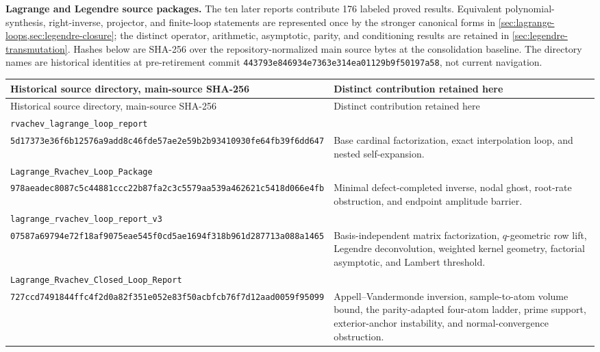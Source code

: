 \documentclass[11pt,oneside]{article}
\numberwithin{equation}{section}
\theoremstyle{definition}
\theoremstyle{remark}
\begin{document}
\medskip
\noindent\textbf{Lagrange and Legendre source packages.}
The ten later reports contribute 176 labeled proved results.  Equivalent
polynomial-synthesis, right-inverse, projector, and finite-loop statements
are represented once by the stronger canonical forms in
\cref{sec:lagrange-loops,sec:legendre-closure}; the distinct operator,
arithmetic, asymptotic, parity, and conditioning results are retained in
\cref{sec:legendre-transmutation}.  Hashes below are SHA-256 over the
repository-normalized main source bytes at the consolidation baseline.  The
directory names are historical identities at pre-retirement commit
\nolinkurl{443793e846934e7363e314ea01129b9f50197a58}, not current navigation.

\begin{center}
\scriptsize
\begin{longtable}{@{}p{}p{}@{}}
\toprule
Historical source directory, main-source SHA-256 & Distinct contribution retained here\\
\midrule
\endfirsthead
\toprule
Historical source directory, main-source SHA-256 & Distinct contribution retained here\\
\midrule
\endhead
\nolinkurl{rvachev_lagrange_loop_report}\\
\nolinkurl{5d17373e36f6b12576a9add8c46fde57ae2e59b2b93410930fe64fb39f6dd647}
& Base cardinal factorization, exact interpolation loop, and nested
self-expansion.\\
\addlinespace
\nolinkurl{Lagrange_Rvachev_Loop_Package}\\
\nolinkurl{978aeadec8087c5c44881ccc22b87fa2c3c5579aa539a462621c5418d066e4fb}
& Minimal defect-completed inverse, nodal ghost, root-rate obstruction, and
endpoint amplitude barrier.\\
\addlinespace
\nolinkurl{lagrange_rvachev_loop_report_v3}\\
\nolinkurl{07587a69794e72f18af9075eae545f0cd5ae1694f318b961d287713a088a1465}
& Basis-independent matrix factorization, $q$-geometric row lift,
Legendre deconvolution, weighted kernel geometry, factorial asymptotic, and
Lambert threshold.\\
\addlinespace
\nolinkurl{Lagrange_Rvachev_Closed_Loop_Report}\\
\nolinkurl{727ccd7491844ffc4f2d0a82f351e052e83f50acbfcb76f7d12aad0059f95099}
& Appell--Vandermonde inversion, sample-to-atom volume bound, the
parity-adapted four-atom ladder, prime support, exterior-anchor instability,
and normal-convergence obstruction.\\

\end{longtable}
\end{center}
\end{document}
